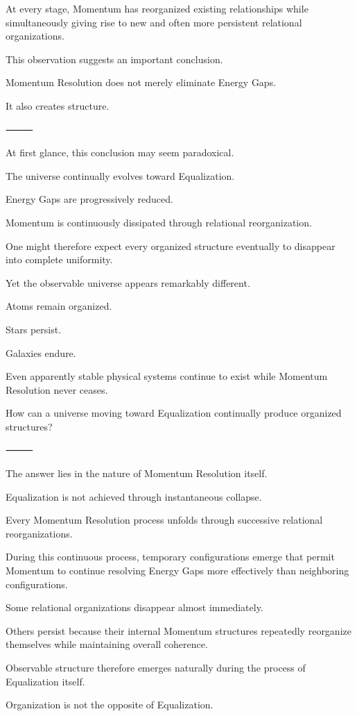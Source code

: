 At every stage, Momentum has reorganized existing relationships while simultaneously giving rise to new and often more persistent relational organizations.

This observation suggests an important conclusion.

Momentum Resolution does not merely eliminate Energy Gaps.

It also creates structure.

⸻

At first glance, this conclusion may seem paradoxical.

The universe continually evolves toward Equalization.

Energy Gaps are progressively reduced.

Momentum is continuously dissipated through relational reorganization.

One might therefore expect every organized structure eventually to disappear into complete uniformity.

Yet the observable universe appears remarkably different.

Atoms remain organized.

Stars persist.

Galaxies endure.

Even apparently stable physical systems continue to exist while Momentum Resolution never ceases.

How can a universe moving toward Equalization continually produce organized structures?

⸻

The answer lies in the nature of Momentum Resolution itself.

Equalization is not achieved through instantaneous collapse.

Every Momentum Resolution process unfolds through successive relational reorganizations.

During this continuous process, temporary configurations emerge that permit Momentum to continue resolving Energy Gaps more effectively than neighboring configurations.

Some relational organizations disappear almost immediately.

Others persist because their internal Momentum structures repeatedly reorganize themselves while maintaining overall coherence.

Observable structure therefore emerges naturally during the process of Equalization itself.

Organization is not the opposite of Equalization.

